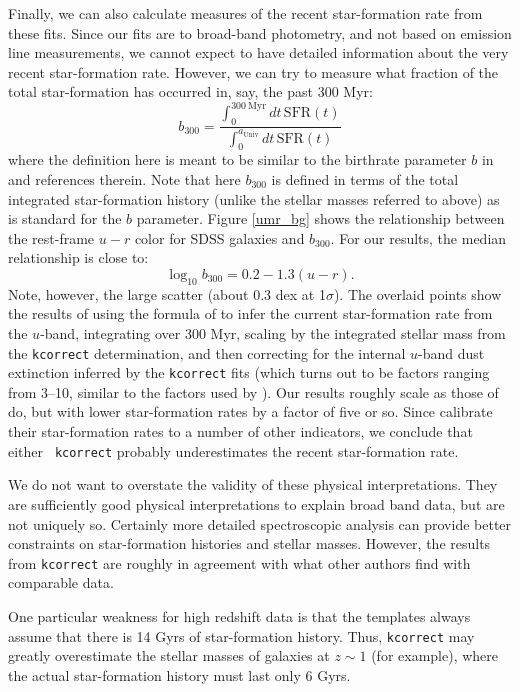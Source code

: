 \documentclass[12pt,preprint]{aastex}
\begin{document}
Finally, we can also calculate measures of the recent star-formation
rate from these fits. Since our fits are to broad-band photometry, and
not based on emission line measurements, we cannot expect to have
detailed information about the very recent star-formation
rate. However, we can try to measure what fraction of the total
star-formation has occurred in, say, the past 300 Myr:
\begin{equation}
b_{300} = \frac{\int_0^{300\mathrm{~Myr}} dt\, \mathrm{SFR}(t)}
{\int_0^{a_{\mathrm{Univ}}} dt\, \mathrm{SFR}(t)}
\end{equation}
where the definition here is meant to be similar to the birthrate
parameter $b$ in \citet{kennicutt94a} and references therein.  Note
that here $b_{300}$ is defined in terms of the total integrated
star-formation history (unlike the stellar masses referred to above)
as is standard for the $b$ parameter. Figure \ref{umr_bg} shows the
relationship between the rest-frame $u-r$ color for SDSS galaxies and
$b_{300}$. For our results, the median relationship is close to:
\begin{equation}
\log_{10} b_{300} = 0.2 - 1.3 (u-r). 
\end{equation}
Note, however, the large scatter (about 0.3 dex at 1$\sigma$).  The
overlaid points show the results of using the formula of \citet{hopkins03a}
to infer the current star-formation rate from the $u$-band,
integrating over 300 Myr, scaling by the integrated stellar mass from
the {\tt kcorrect} determination, and then correcting for the internal
$u$-band dust extinction inferred by the {\tt kcorrect} fits (which
turns out to be factors ranging from 3--10, similar to the factors
used by \citealt{hopkins03a}).  Our results roughly scale as those of
\citet{hopkins03a} do, but with lower star-formation rates by a factor
of five or so. Since \citet{hopkins03a} calibrate their star-formation
rates to a number of other indicators, we conclude that either {\tt
kcorrect} probably underestimates the recent star-formation rate.

We do not want to overstate the validity of these physical
interpretations. They are sufficiently good physical interpretations
to explain broad band data, but are not uniquely so. Certainly more
detailed spectroscopic analysis can provide better constraints on
star-formation histories and stellar masses.  However, the results
from {\tt kcorrect} are roughly in agreement with what other authors
find with comparable data.

One particular weakness for high redshift data is that the templates
always assume that there is 14 Gyrs of star-formation history.  Thus,
{\tt kcorrect} may greatly overestimate the stellar masses of galaxies
at $z \sim 1$ (for example), where the actual star-formation history
must last only 6 Gyrs.
\end{document}

